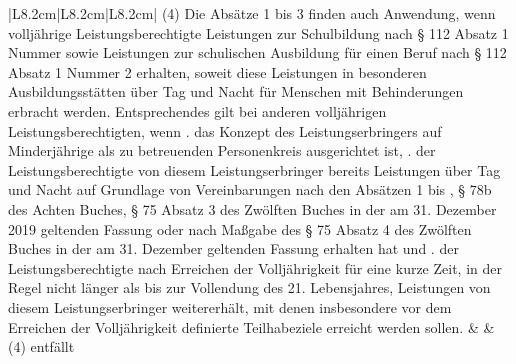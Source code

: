\documentclass[10pt,a4paper,landscape]{article}
\begin{document}
\begin{longtable}{|L{8.2cm}|L{8.2cm}|L{8.2cm}|}
(4) \textcolor{diffred}{Die Absätze 1 bis 3 finden auch  \newline Anwendung, wenn volljährige  \newline Leistungsberechtigte Leistungen zur  \newline Schulbildung nach \S{} 112 Absatz 1 Nummer   sowie Leistungen zur schulischen  \newline Ausbildung für einen Beruf nach \S{} 112  \newline Absatz 1 Nummer 2 erhalten, soweit diese  \newline Leistungen in besonderen  \newline Ausbildungsstätten über Tag und Nacht für  \newline Menschen mit Behinderungen erbracht  \newline werden. Entsprechendes gilt bei anderen  \newline volljährigen Leistungsberechtigten, wenn  .  \newline das Konzept des Leistungserbringers auf  \newline Minderjährige als zu betreuenden  \newline Personenkreis ausgerichtet ist,  .  \newline der Leistungsberechtigte von diesem  \newline Leistungserbringer bereits Leistungen über  \newline Tag und Nacht auf Grundlage von  \newline Vereinbarungen nach den Absätzen 1 bis  , \S{} 78b des Achten Buches, \S{} 75 Absatz 3  \newline des Zwölften Buches in der am 31.  \newline Dezember 2019 geltenden Fassung oder  \newline nach Maßgabe des \S{} 75 Absatz 4 des  \newline Zwölften Buches in der am 31. Dezember   geltenden Fassung erhalten hat und  .  \newline der Leistungsberechtigte nach Erreichen  \newline der Volljährigkeit für eine kurze Zeit, in der  \newline Regel nicht länger als bis zur Vollendung  \newline des 21. Lebensjahres, Leistungen von  \newline diesem Leistungserbringer weitererhält, mit  \newline denen insbesondere vor dem Erreichen der  \newline Volljährigkeit definierte Teilhabeziele  \newline erreicht werden sollen.} &  & (4) \textcolor{diffgreen}{entfällt} \\

\end{longtable}
\end{document}
